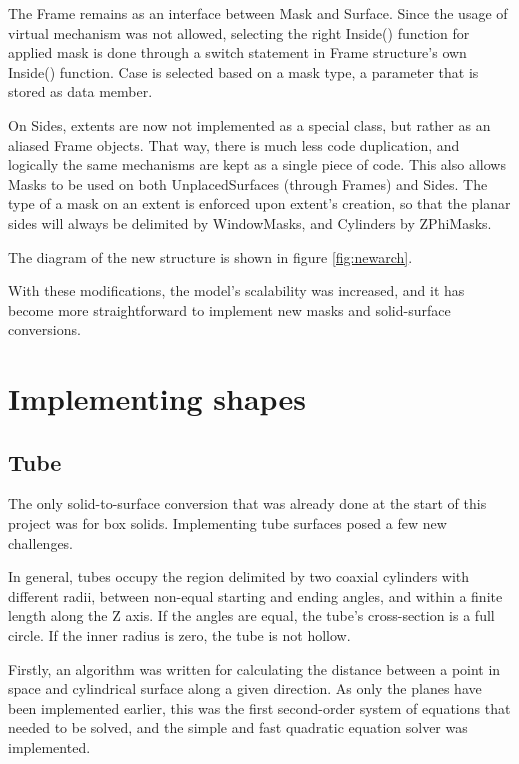 \documentclass[12pt, a4paper]{article}
\begin{document}
The Frame remains as an interface between Mask and Surface. Since the usage of virtual mechanism was not allowed, selecting the right {\selectfont Inside()} function for applied mask is done through a switch statement in Frame structure's own {\selectfont Inside()} function. Case is selected based on a mask type, a parameter that is stored as data member.

On Sides, extents are now not implemented as a special class, but rather as an aliased Frame objects. That way, there is much less code duplication, and logically the same mechanisms are kept as a single piece of code. This also allows Masks to be used on both UnplacedSurfaces (through Frames) and Sides. The type of a mask on an extent is enforced upon extent's creation, so that the planar sides will always be delimited by WindowMasks, and Cylinders by ZPhiMasks.

The diagram of the new structure is shown in figure \ref{fig:newarch}.

With these modifications, the model's scalability was increased, and it has become more straightforward to implement new masks and solid-surface conversions.


\section{Implementing shapes}

\subsection{Tube}

The only solid-to-surface conversion that was already done at the start of this project was for box solids. Implementing tube surfaces posed a few new challenges.

In general, tubes occupy the region delimited by two coaxial cylinders with different radii, between non-equal starting and ending angles, and within a finite length along the Z axis. If the angles are equal, the tube's cross-section is a full circle. If the inner radius is zero, the tube is not hollow.

Firstly, an algorithm was written for calculating the distance between a point in space and cylindrical surface along a given direction. As only the planes have been implemented earlier, this was the first second-order system of equations that needed to be solved, and the simple and fast quadratic equation solver was implemented.
\end{document}
